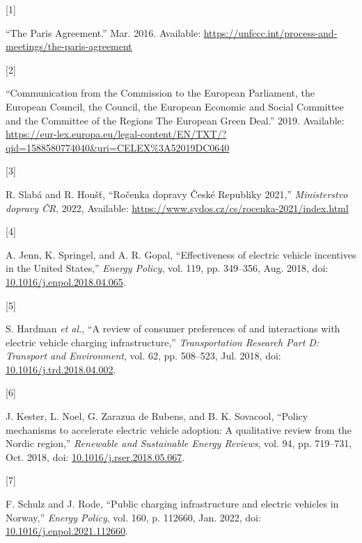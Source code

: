 \documentclass{mmeproc}
\newlength{\cslhangindent}
\newlength{\csllabelwidth}
\newenvironment{CSLReferences}[2] %
 {%
  \setlength{\parindent}{0pt}
  \ifodd #1
  \fi
  \setlength{\parskip}{-2pt}
 }%
 {}
\newcommand{\CSLLeftMargin}[1]{\parbox[t]{\csllabelwidth}{#1}}
\newcommand{\CSLRightInline}[1]{\parbox[t]{\linewidth - \csllabelwidth}{#1}\break}
\begin{document}
\hfill

\hypertarget{refs}{}
\begin{CSLReferences}{0}{0}
\leavevmode{}%
\CSLLeftMargin{{[}1{]} }%
\CSLRightInline{{``The {Paris} {Agreement}.''} Mar. 2016. Available:
\url{https://unfccc.int/process-and-meetings/the-paris-agreement}}

\leavevmode{}%
\CSLLeftMargin{{[}2{]} }%
\CSLRightInline{{``Communication from the {Commission} to the {European}
{Parliament}, the {European} {Council}, the {Council}, the {European}
{Economic} and {Social} {Committee} and the {Committee} of the {Regions}
{The} {European} {Green} {Deal}.''} 2019. Available:
\url{https://eur-lex.europa.eu/legal-content/EN/TXT/?qid=1588580774040\&uri=CELEX\%3A52019DC0640}}

\leavevmode{}%
\CSLLeftMargin{{[}3{]} }%
\CSLRightInline{R. Slabá and R. Houšť, {``Ročenka dopravy {České
Republiky} 2021,''} \emph{Ministerstvo dopravy ČR}, 2022, Available:
\url{https://www.sydos.cz/cs/rocenka-2021/index.html}}

\leavevmode{}%
\CSLLeftMargin{{[}4{]} }%
\CSLRightInline{A. Jenn, K. Springel, and A. R. Gopal, {``Effectiveness
of electric vehicle incentives in the {United} {States},''} \emph{Energy
Policy}, vol. 119, pp. 349--356, Aug. 2018, doi:
\href{https://doi.org/10.1016/j.enpol.2018.04.065}{10.1016/j.enpol.2018.04.065}.}

\leavevmode{}%
\CSLLeftMargin{{[}5{]} }%
\CSLRightInline{S. Hardman \emph{et al.}, {``A review of consumer
preferences of and interactions with electric vehicle charging
infrastructure,''} \emph{Transportation Research Part D: Transport and
Environment}, vol. 62, pp. 508--523, Jul. 2018, doi:
\href{https://doi.org/10.1016/j.trd.2018.04.002}{10.1016/j.trd.2018.04.002}.}

\leavevmode{}%
\CSLLeftMargin{{[}6{]} }%
\CSLRightInline{J. Kester, L. Noel, G. Zarazua de Rubens, and B. K.
Sovacool, {``Policy mechanisms to accelerate electric vehicle adoption:
{A} qualitative review from the {Nordic} region,''} \emph{Renewable and
Sustainable Energy Reviews}, vol. 94, pp. 719--731, Oct. 2018, doi:
\href{https://doi.org/10.1016/j.rser.2018.05.067}{10.1016/j.rser.2018.05.067}.}

\leavevmode{}%
\CSLLeftMargin{{[}7{]} }%
\CSLRightInline{F. Schulz and J. Rode, {``Public charging infrastructure
and electric vehicles in {Norway},''} \emph{Energy Policy}, vol. 160, p.
112660, Jan. 2022, doi:
\href{https://doi.org/10.1016/j.enpol.2021.112660}{10.1016/j.enpol.2021.112660}.}


\end{CSLReferences}
\end{document}
